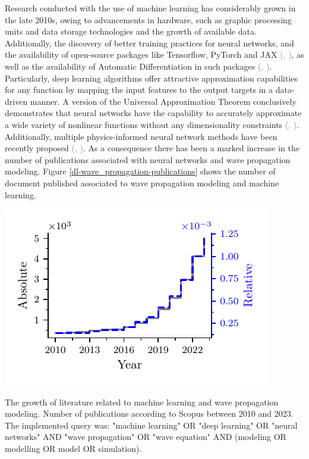 \documentclass{tufte-handout}
\renewcommand{\citep}[2][]{\textcolor{gray}{(\citeauthor{#2}, \citeyear[#1]{#2})}}
\begin{document}
Research conducted with the use of machine learning has considerably grown in the late 2010s, owing to advancements in hardware, such as graphic processing units and data storage technologies and the growth of available data. Additionally, the discovery of better training practices for neural networks, and the availability of open-source packages like Tensorflow, PyTorch and JAX \citep{abadi_tensorflow_2016,paszke_pytorch_2019,jax2018github}, as well as the availability of Automatic Differentiation in such packages \citep{paszke_automatic_2017,baydin_automatic_2017}. Particularly, deep learning algorithms offer attractive approximation capabilities for any function by mapping the input features to the output targets in a data-driven manner. A version of the Universal Approximation Theorem conclusively demonstrates that neural networks have the capability to accurately approximate a wide variety of nonlinear functions without any dimensionality constraints \citep{barron_universal_1993}. Additionally, multiple physics-informed neural network methods have been recently proposed \citep{cuomo_scientific_2022}. As a consequence there has been a marked increase in the number of publications associated with neural networks and wave propagation modeling. Figure \ref{dl-wave_propagation-publications} shows the number of document published associated to wave propagation modeling and machine learning. 

\begin{marginfigure}
    \includegraphics[scale=1]{figs/publications_with_relative.pdf}
    \caption{The growth of literature related to machine learning and wave propagation modeling. Number of publications according to Scopus between 2010 and 2023. The implemented query was: "machine learning" OR "deep learning" OR "neural networks" 
AND "wave propagation" OR "wave equation" 
AND (modeling OR modelling OR model OR simulation).}
    \label{dl-wave_propagation-publications}
\end{marginfigure}
\end{document}
